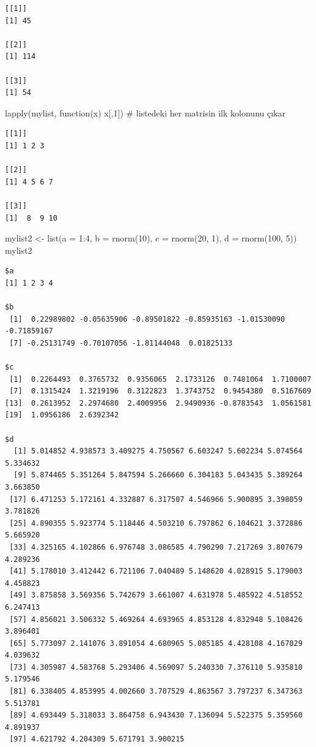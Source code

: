 \documentclass[
  letterpaper,
  DIV=11,
  numbers=noendperiod]{scrreprt}
\newenvironment{Shaded}{\begin{snugshade}}{\end{snugshade}}
\newcommand{\AttributeTok}[1]{\textcolor[rgb]{0.40,0.45,0.13}{#1}}
\newcommand{\CommentTok}[1]{\textcolor[rgb]{0.37,0.37,0.37}{#1}}
\newcommand{\ControlFlowTok}[1]{\textcolor[rgb]{0.00,0.23,0.31}{#1}}
\newcommand{\DecValTok}[1]{\textcolor[rgb]{0.68,0.00,0.00}{#1}}
\newcommand{\FunctionTok}[1]{\textcolor[rgb]{0.28,0.35,0.67}{#1}}
\newcommand{\NormalTok}[1]{\textcolor[rgb]{0.00,0.23,0.31}{#1}}
\newcommand{\OtherTok}[1]{\textcolor[rgb]{0.00,0.23,0.31}{#1}}
\newcommand{\SpecialCharTok}[1]{\textcolor[rgb]{0.37,0.37,0.37}{#1}}
\begin{document}
\begin{verbatim}
[[1]]
[1] 45

[[2]]
[1] 114

[[3]]
[1] 54
\end{verbatim}

\begin{Shaded}
\begin{Highlighting}[]
\FunctionTok{lapply}\NormalTok{(mylist, }\ControlFlowTok{function}\NormalTok{(x) x[,}\DecValTok{1}\NormalTok{]) }\CommentTok{\# listedeki her matrisin ilk kolonunu çıkar}
\end{Highlighting}
\end{Shaded}

\begin{verbatim}
[[1]]
[1] 1 2 3

[[2]]
[1] 4 5 6 7

[[3]]
[1]  8  9 10
\end{verbatim}

\begin{Shaded}
\begin{Highlighting}[]
\NormalTok{mylist2 }\OtherTok{\textless{}{-}} \FunctionTok{list}\NormalTok{(}\AttributeTok{a =} \DecValTok{1}\SpecialCharTok{:}\DecValTok{4}\NormalTok{, }\AttributeTok{b =} \FunctionTok{rnorm}\NormalTok{(}\DecValTok{10}\NormalTok{), }\AttributeTok{c =} \FunctionTok{rnorm}\NormalTok{(}\DecValTok{20}\NormalTok{, }\DecValTok{1}\NormalTok{), }\AttributeTok{d =} \FunctionTok{rnorm}\NormalTok{(}\DecValTok{100}\NormalTok{, }\DecValTok{5}\NormalTok{))}
\NormalTok{mylist2}
\end{Highlighting}
\end{Shaded}

\begin{verbatim}
$a
[1] 1 2 3 4

$b
 [1]  0.22989802 -0.05635906 -0.89501822 -0.85935163 -1.01530090 -0.71859167
 [7] -0.25131749 -0.70107056 -1.81144048  0.01825133

$c
 [1]  0.2264493  0.3765732  0.9356065  2.1733126  0.7481064  1.7100007
 [7]  0.1315424  1.3219196  0.3122823  1.3743752  0.9454380  0.5167609
[13]  0.2613952  2.2974680  2.4009956  2.9490936 -0.8783543  1.0561581
[19]  1.0956186  2.6392342

$d
  [1] 5.014852 4.938573 3.409275 4.750567 6.603247 5.602234 5.074564 5.334632
  [9] 5.874465 5.351264 5.847594 5.266660 6.304183 5.043435 5.389264 3.663850
 [17] 6.471253 5.172161 4.332887 6.317507 4.546966 5.900895 3.398059 3.781826
 [25] 4.890355 5.923774 5.118446 4.503210 6.797862 6.104621 3.372886 5.665920
 [33] 4.325165 4.102866 6.976748 3.086585 4.790290 7.217269 3.807679 4.289236
 [41] 5.178010 3.412442 6.721106 7.040489 5.148620 4.028915 5.179003 4.458823
 [49] 3.875858 3.569356 5.742679 3.661007 4.631978 5.485922 4.518552 6.247413
 [57] 4.856021 3.506332 5.469264 4.693965 4.853128 4.832948 5.108426 3.896401
 [65] 5.773097 2.141076 3.891054 4.680965 5.085185 4.428108 4.167029 4.039632
 [73] 4.305987 4.583768 5.293406 4.569097 5.240330 7.376110 5.935810 5.179546
 [81] 6.338405 4.853995 4.002660 3.707529 4.863567 3.797237 6.347363 5.513781
 [89] 4.693449 5.318033 3.864758 6.943430 7.136094 5.522375 5.359560 4.891937
 [97] 4.621792 4.204309 5.671791 3.900215
\end{verbatim}
\end{document}
